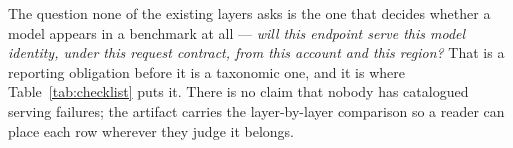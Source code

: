 \noindent
The question none of the existing layers asks is the one that decides whether a model appears in a
benchmark at all --- \emph{will this endpoint serve this model identity, under this request contract, from
this account and this region?} That is a reporting obligation before it is a taxonomic one, and it is where
Table~\ref{tab:checklist} puts it. There is no claim that nobody has catalogued serving failures; the artifact
carries the layer-by-layer comparison so a reader can place each row wherever they judge it belongs.
